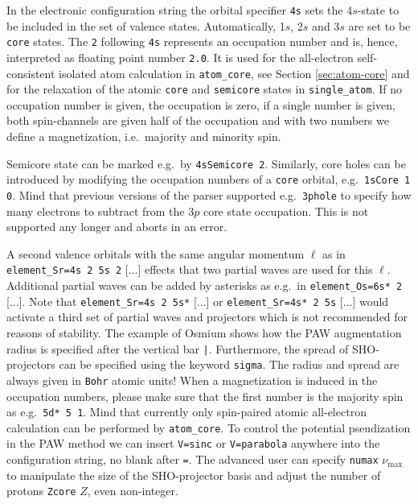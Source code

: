 \documentclass[oribibl]{llncs}
\newcommand{\um}[1]{_{\mathrm{#1}}}
\newcommand{\ttt}[1]{\texttt{#1}}
\begin{document}
In the electronic configuration string the orbital specifier \ttt{4s} sets the 4$s$-state to be 
included in the set of valence states. Automatically, 1$s$, 2$s$ and 3$s$ are set to 
be \ttt{core} states.
The \ttt{2} following \ttt{4s} represents an occupation number
and is, hence, interpreted as floating point number \ttt{2.0}.
It is used for the all-electron self-consistent isolated atom calculation in \ttt{atom\_core}, see Section \ref{sec:atom-core}
and for the relaxation of the atomic \ttt{core} and \ttt{semicore} states in \ttt{single\_atom}.
If no occupation number is given, the occupation is zero, if a single number is given,
both spin-channels are given half of the occupation and with two numbers
we define a magnetization, i.e.~majority and minority spin.

\noindent
Semicore state can be marked e.g.~by \ttt{4sSemicore 2}.
Similarly, core holes can be introduced by modifying the occupation numbers of
a \ttt{core} orbital, e.g.~\ttt{1sCore 1 0}.
Mind that previous versions of the parser supported e.g.~\ttt{3phole}
to specify how many electrons to subtract from the $3p$ core state occupation.
This is not supported any longer and aborts in an error.

\noindent
A second valence orbitals with the same angular momentum $\ell$ as in \ttt{element\_Sr=4s 2 5s 2} [...] 
effects that two partial waves are used for this $\ell$.
Additional partial waves can be added by asterisks as e.g.~in \ttt{element\_Os=6s* 2} [...].
Note that \ttt{element\_Sr=4s 2 5s*} [...] or \ttt{element\_Sr=4s* 2 5s} [...] %
would activate a third set of partial waves and projectors which is not recommended for reasons of stability.
The example of Osmium shows how the \ac{PAW} augmentation radius is specified after the vertical bar \ttt{|}.
Furthermore, the spread of \ac{SHO}-projectors can be specified using the keyword \ttt{sigma}.
The radius and spread are always given in \ttt{Bohr} atomic units!
\noindent
When a magnetization is induced in the occupation numbers,
please make sure that the first number is the majority spin as e.g.~\ttt{5d* 5 1}.
Mind that currently only spin-paired atomic all-electron calculation can be performed by \ttt{atom\_core}.
%
To control the potential pseudization in the \ac{PAW} method we can insert 
\ttt{V=sinc} or \ttt{V=parabola} anywhere into the configuration string, no blank after \ttt{=}.
The advanced user can specify \ttt{numax} $\nu\um{max}$ to manipulate the size of the \ac{SHO}-projector basis
and adjust the number of protons \ttt{Zcore} $Z$, even non-integer.
%
%
%
\end{document}
